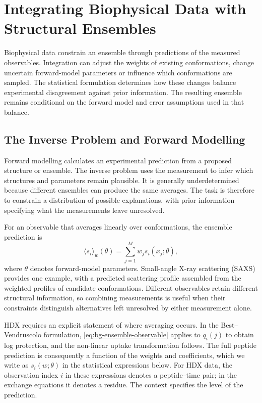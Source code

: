 \section{Integrating Biophysical Data with Structural Ensembles}
\label{sec:bg-integration}

Biophysical data constrain an ensemble through predictions of the measured observables. Integration can adjust the weights of existing conformations, change uncertain forward-model parameters or influence which conformations are sampled. The statistical formulation determines how these changes balance experimental disagreement against prior information.\supercite{bmsb2012ch12,cesariUsingMaximumEntropy2018} The resulting ensemble remains conditional on the forward model and error assumptions used in that balance.

\subsection{The Inverse Problem and Forward Modelling}
\label{sec:bg-inverse-problem}

Forward modelling calculates an experimental prediction from a proposed structure or ensemble. The inverse problem uses the measurement to infer which structures and parameters remain plausible. It is generally underdetermined because different ensembles can produce the same averages.\supercite{bmsb2012ch12,berlinRecoveringRepresentativeConformational2013} The task is therefore to constrain a distribution of possible explanations, with prior information specifying what the measurements leave unresolved.

For an observable that averages linearly over conformations, the ensemble prediction is
\begin{equation}
    \langle s_i\rangle_w(\theta)
    =\sum_{j=1}^{M}w_js_i(x_j;\theta),
    \label{eq:bg-ensemble-observable}
\end{equation}
where $\theta$ denotes forward-model parameters. Small-angle X-ray scattering (SAXS) provides one example, with a predicted scattering profile assembled from the weighted profiles of candidate conformations.\supercite{bmsb2012ch13} Different observables retain different structural information, so combining measurements is useful when their constraints distinguish alternatives left unresolved by either measurement alone.

HDX requires an explicit statement of where averaging occurs. In the Best--Vendruscolo formulation, \cref{eq:bg-ensemble-observable} applies to $q_i(j)$ to obtain log protection, and the non-linear uptake transformation follows. The full peptide prediction is consequently a function of the weights and coefficients, which we write as $s_i(w;\theta)$ in the statistical expressions below. For HDX data, the observation index $i$ in these expressions denotes a peptide--time pair; in the exchange equations it denotes a residue. The context specifies the level of the prediction.


